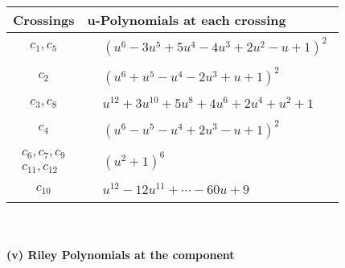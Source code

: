 \documentclass[1p]{elsarticle_modified}
\theoremstyle{definition}
\begin{document}
\begin{tabular}{m{50pt}|m{274pt}}
Crossings & \hspace{64pt}u-Polynomials at each crossing \\
\hline $$\begin{aligned}c_{1},c_{5}\end{aligned}$$&$\begin{aligned}
&(u^6-3 u^5+5 u^4-4 u^3+2 u^2- u+1)^2
\end{aligned}$\\
\hline $$\begin{aligned}c_{2}\end{aligned}$$&$\begin{aligned}
&(u^6+u^5- u^4-2 u^3+u+1)^2
\end{aligned}$\\
\hline $$\begin{aligned}c_{3},c_{8}\end{aligned}$$&$\begin{aligned}
&u^{12}+3 u^{10}+5 u^8+4 u^6+2 u^4+u^2+1
\end{aligned}$\\
\hline $$\begin{aligned}c_{4}\end{aligned}$$&$\begin{aligned}
&(u^6- u^5- u^4+2 u^3- u+1)^2
\end{aligned}$\\
\hline $$\begin{aligned}c_{6},c_{7},c_{9}\\c_{11},c_{12}\end{aligned}$$&$\begin{aligned}
&(u^2+1)^6
\end{aligned}$\\
\hline $$\begin{aligned}c_{10}\end{aligned}$$&$\begin{aligned}
&u^{12}-12 u^{11}+\cdots-60 u+9
\end{aligned}$\\
\hline
\end{tabular}\\~\\
\newpage\renewcommand{\arraystretch}{1}
\flushleft \textbf{(v) Riley Polynomials at the component}\newline \\
\end{document}
